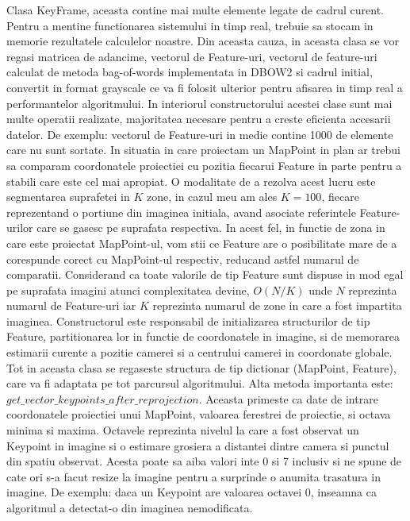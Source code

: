 \documentclass[12pt,a4paper]{report}
\begin{document}
Clasa KeyFrame, aceasta contine mai multe elemente legate de cadrul curent. Pentru a mentine 
functionarea sistemului in timp real, trebuie sa stocam in memorie rezultatele calculelor noastre.
Din aceasta cauza, in aceasta clasa se vor regasi matricea de adancime, vectorul de Feature-uri,
vectorul de feature-uri calculat de metoda bag-of-words implementata in DBOW2 si cadrul initial, 
convertit in format grayscale ce va fi folosit ulterior pentru afisarea in timp real a performantelor
algoritmului. In interiorul constructorului acestei clase sunt mai multe operatii realizate,
majoritatea necesare pentru a creste eficienta accesarii datelor. De exemplu: vectorul de Feature-uri
in medie contine 1000 de elemente care nu sunt sortate. In situatia in care proiectam un MapPoint in 
plan ar trebui sa comparam coordonatele proiectiei cu pozitia fiecarui Feature in parte pentru a 
stabili care este cel mai apropiat. O modalitate de a rezolva acest lucru este segmentarea suprafetei
in \(K\) zone, in cazul meu am ales $ K = 100$, fiecare reprezentand o portiune din imaginea initiala,
avand asociate referintele Feature-urilor care se gasesc pe suprafata respectiva. In acest fel,
in functie de zona in care este proiectat MapPoint-ul, vom stii ce Feature are o posibilitate
mare de a corespunde corect cu MapPoint-ul respectiv, reducand astfel numarul de comparatii. 
Considerand ca toate valorile de tip Feature sunt dispuse in mod egal pe suprafata imagini atunci
complexitatea devine, $ O(N / K) $ unde \(N\) reprezinta numarul de Feature-uri iar \(K\) reprezinta
numarul de zone in care a fost impartita imaginea. Constructorul este responsabil de initializarea
structurilor de tip Feature, partitionarea lor in functie de coordonatele in imagine, si de memorarea
estimarii curente a pozitie camerei si a centrului camerei in coordonate globale. Tot in aceasta 
clasa se regaseste structura de tip dictionar (MapPoint, Feature), care va fi adaptata pe tot 
parcursul algoritmului. Alta metoda importanta este: $ get\_vector\_keypoints\_after\_reprojection $.
Aceasta primeste ca date de intrare coordonatele proiectiei unui MapPoint, valoarea ferestrei 
de proiectie, si octava minima si maxima. Octavele reprezinta nivelul la care a fost observat 
un Keypoint in imagine si o estimare grosiera a distantei dintre camera si punctul din spatiu 
observat. Acesta poate sa aiba valori inte 0 si 7 inclusiv si ne spune de cate ori 
s-a facut resize la imagine pentru a surprinde o anumita trasatura in imagine. De exemplu: daca 
un Keypoint are valoarea octavei 0, inseamna ca algoritmul a detectat-o din imaginea nemodificata.
\end{document}
